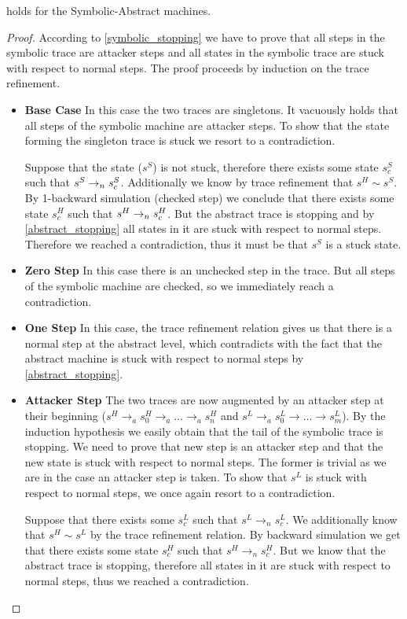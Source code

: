 \begin{lemma}
  \label{as_implies_ss}
   holds for the Symbolic-Abstract machines.
\end{lemma}
\begin{proof}
  According to \cref{symbolic_stopping} we have to prove that all steps
  in the symbolic trace are attacker steps and all states in the symbolic
  trace are stuck with respect to normal steps.
  The proof proceeds by induction on the trace refinement.
  \begin{itemize}
  \item \textbf{Base Case} In this case the two traces are singletons.
    It vacuously holds that all steps of the symbolic machine are
    attacker steps. To show that the state forming the singleton trace
    is stuck we resort to a contradiction.

    Suppose that the state ($s^S$) is not stuck, therefore there
    exists some state $s^S_c$ such that
    $s^S\to_ns^S_c$. Additionally we know by trace refinement that
    $s^H \sim s^S$. By 1-backward simulation (checked step) we
    conclude that there exists some state $s^H_c$ such that
    $s^H\to_ns^H_c$. But the abstract trace is stopping and by
    \cref{abstract_stopping} all states in it are stuck with respect
    to normal steps. Therefore we reached a contradiction, thus it
    must be that $s^S$ is a stuck state.    
  \item \textbf{Zero Step} In this case there is an unchecked step
    in the trace. But all steps of the symbolic machine are checked,
    so we immediately reach a contradiction.
  \item \textbf{One Step} In this case, the trace refinement relation
    gives us that there is a normal step at the abstract level, which
    contradicts with the fact that the abstract machine is stuck
    with respect to normal steps by \cref{abstract_stopping}.
  \item \textbf{Attacker Step} The two traces are now augmented by an
    attacker step at their beginning ($s^H \to_a s^H_0 \to_a \ldots
    \to_a s^H_n$ and $s^L \to_a s^L_0 \to \ldots \to s^L_m$). By the
    induction hypothesis we easily obtain that the tail of the
    symbolic trace is stopping. We need to prove that new step is an
    attacker step and that the new state is stuck with respect to
    normal steps. The former is trivial as we are in the case an
    attacker step is taken. To show that $s^L$ is stuck with
    respect to normal steps, we once again resort to a contradiction.
    
    Suppose that there exists some $s^L_c$ such that $s^L \to_n s^L_c$.
    We additionally know that $s^H \sim s^L$ by the trace refinement
    relation. By backward simulation we get that there exists
    some state $s^H_c$ such that $s^H \to_n s^H_c$. But we know that
    the abstract trace is stopping, therefore all states in it
    are stuck with respect to normal steps, thus we reached
    a contradiction.
  \end{itemize}
\end{proof}

